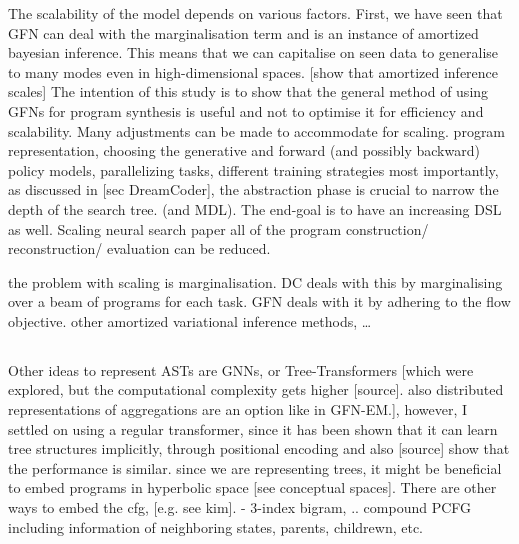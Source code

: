 The scalability of the model depends on various factors. First, we have seen that GFN can deal with the marginalisation term and is an instance of amortized bayesian inference. This means that we can capitalise on seen data to generalise to many modes even in high-dimensional spaces. [show that amortized inference scales]
The intention of this study is to show that the general method of using GFNs for program synthesis is useful and not to optimise it for efficiency and scalability. Many adjustments can be made to accommodate for scaling. 
program representation, 
choosing the generative and forward (and possibly backward) policy models, 
parallelizing tasks,
different training strategies
most importantly, as discussed in [sec DreamCoder], the abstraction phase is crucial to narrow the depth of the search tree. (and MDL). 
The end-goal is to have an increasing DSL as well. 
Scaling neural search paper
all of the program construction/ reconstruction/ evaluation can be reduced. 


the problem with scaling is marginalisation. DC deals with this by marginalising over a beam of programs for each task. GFN deals with it by adhering to the flow objective. 
other amortized variational inference methods, \dots



















\subsection{}
Other ideas to represent ASTs are GNNs, or Tree-Transformers [which were explored, but the computational complexity gets higher [source]. also distributed representations of aggregations are an option like in GFN-EM.], however, I settled on using a regular transformer, since it has been shown that it can learn tree structures implicitly, through positional encoding and also [source] show that the performance is similar.
since we are representing trees, it might be beneficial to embed programs in hyperbolic space [see conceptual spaces]. 
There are other ways to embed the cfg, [e.g. see kim].
- 3-index bigram, .. compound PCFG including information of neighboring states, parents, childrewn, etc. 

